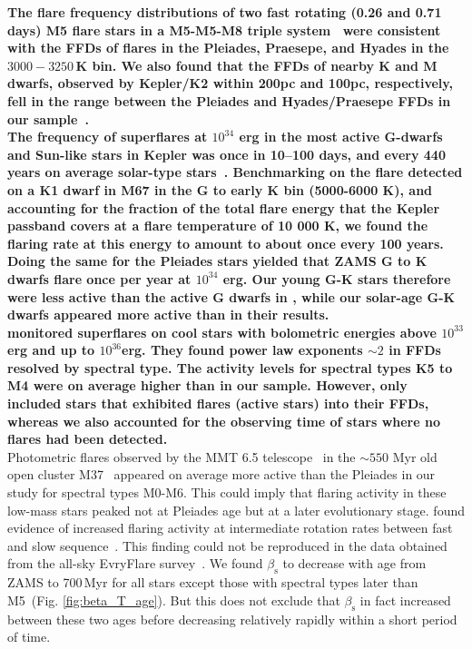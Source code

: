 \documentclass{aa}
\begin{document}
\textbf{The flare frequency distributions of two fast rotating (0.26 and 0.71 days) M5 flare stars in a M5-M5-M8 triple system~\citep{lurie2015} were consistent with the FFDs of flares in the Pleiades, Praesepe, and Hyades in the $3000-3250\,$K bin. We also found that the FFDs of nearby K and M dwarfs, observed by Kepler/K2 within 200pc and 100pc, respectively, fell in the range between the Pleiades and Hyades/Praesepe FFDs in our sample~\citep{lin2019}.
\\
The frequency of superflares at $10^{34}$ erg in the most active G-dwarfs and Sun-like stars in Kepler was once in 10–100 days, and every 440 years on average solar-type stars~\citep{shibayama2013}. Benchmarking on the flare detected on a K1 dwarf in M67 in the G to early K bin (5000-6000 K), and accounting for the fraction of the total flare energy that the Kepler passband covers at a flare temperature of 10 000 K, we found the flaring rate at this energy to amount to about once every 100 years. Doing the same for the Pleiades stars yielded that ZAMS G to K dwarfs flare once per year at $10^{34}$ erg. Our young G-K stars therefore were less active than the active G dwarfs in \citet{shibayama2013}, while our solar-age G-K dwarfs appeared more active than in their results.
\\
\citet{howard2019} monitored superflares on cool stars with bolometric energies above $10^{33}$ erg and up to $10^{36}$erg. They found power law exponents $\sim 2$ in FFDs resolved by spectral type. The activity levels for spectral types K5 to M4 were on average higher than in our sample. However, \citet{howard2019} only included stars that exhibited flares (active stars) into their FFDs, whereas we also accounted for the observing time of stars where no flares had been detected.} 
\\
Photometric flares observed by the MMT 6.5 telescope~\citep{hartman2008} in the $\sim550$ Myr old open cluster M37~\citep{chang2015} appeared on average more active than the Pleiades in our study for spectral types M0-M6. This could imply that flaring activity in these low-mass stars peaked not at Pleiades age but at a later evolutionary stage. \citet{mondrik2019} found evidence of increased flaring activity at intermediate rotation rates between fast and slow sequence~\citep{barnes_rotational_2003}. This finding could not be reproduced in the data obtained from the all-sky EvryFlare survey~\citep{howard_evryflare2arxiv_2019}. We found $\beta_\mathrm{s}$ to decrease with age from ZAMS to 700\,Myr for all stars except those with spectral types later than M5~(Fig. \ref{fig:beta_T_age}). But this does not exclude that $\beta_\mathrm{s}$ in fact increased between these two ages before decreasing relatively rapidly within a short period of time.
\end{document}
